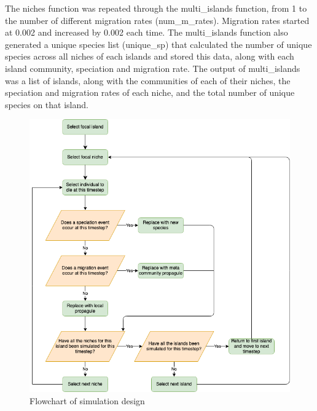 \documentclass{article}
\begin{document}
The niches function was repeated through the multi\_islands function, from 1 to the number of different migration rates (num\_m\_rates). Migration rates started at 0.002 and increased by 0.002 each time. The multi\_islands function also generated a unique species list (unique\_sp) that calculated the number of unique species across all niches of each islands and stored this data, along with each island community, speciation and migration rate. The output of multi\_islands was a list of islands, along with the communities of each of their niches, the speciation and migration rates of each niche, and the total number of unique species on that island. \bigskip
 
 \begin{figure}[h!]
\centering
  \includegraphics[scale=0.4]{../../Other/neutral_flowchart.png}
  \caption{Flowchart of simulation design}
  \label{fig:Flowchart}
\end{figure}
 
\end{document}
